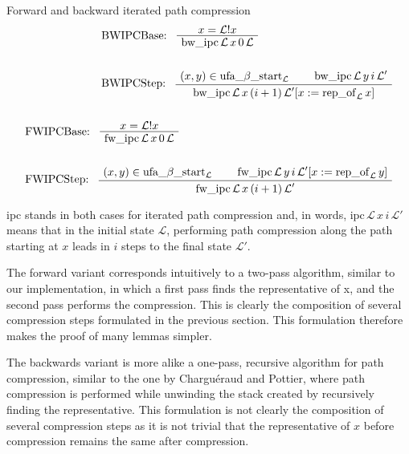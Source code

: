 \documentclass[headsepline,footsepline,footinclude=false,oneside,fontsize=11pt,paper=a4,listof=totoc,bibliography=totoc]{scrbook} %
\begin{document}
\begin{definition}{Forward and backward iterated path compression}
\begin{align}
\begin{split}
	&\text{ BWIPCBase: 
	\AxiomC{$x = \mathcal{L}!x$}
	\UnaryInfC{$\mathrm{bw\_ipc}\, \mathcal{L}\, x\, 0\, \mathcal{L}$}
	\DisplayProof
	} \\
	\\
	&\text{ BWIPCStep: 
		\AxiomC{$(x,y) \in \ufabstart$}
		\AxiomC{$\mathrm{bw\_ipc}\, \mathcal{L}\, y\, i\, \mathcal{L}'$}
		\BinaryInfC{$\mathrm{bw\_ipc}\, \mathcal{L}\, x\, (i + 1)\, \mathcal{L}'[x := \repof x]$}
		\DisplayProof
	}
\end{split}
\\
\begin{split}
	&\\
	&\text{ FWIPCBase: 
	\AxiomC{$x = \mathcal{L}!x$}
	\UnaryInfC{$\mathrm{fw\_ipc}\, \mathcal{L}\, x\, 0\, \mathcal{L}$}
	\DisplayProof
	} \\
	\\
	&\text{ FWIPCStep: 
	\AxiomC{$(x,y) \in \ufabstart$}
	\AxiomC{$\mathrm{fw\_ipc}\, \mathcal{L}\, y\, i\, \mathcal{L}'[x := \repof y]$}
	\BinaryInfC{$\mathrm{fw\_ipc}\, \mathcal{L}\, x\, (i + 1)\, \mathcal{L}'$}
	\DisplayProof
	}
\end{split}
\end{align}

ipc stands in both cases for iterated path compression and, in words, $\mathrm{ipc}\,  \mathcal{L}\, x\, i\, \mathcal{L}'$ means that in the initial state $\mathcal{L}$, performing path compression along the path starting at $x$ leads in $i$ steps to the final state $\mathcal{L}'$.
\end{definition}

The forward variant corresponds intuitively to a two-pass algorithm, similar to our implementation, in which a first pass finds the representative of x, and the second pass performs the compression. This is clearly the composition of several compression steps formulated in the previous section. This formulation therefore makes the proof of many lemmas simpler.

The backwards variant is more alike a one-pass, recursive algorithm for path compression, similar to the one by Charguéraud and Pottier, where path compression is performed while unwinding the stack created by recursively finding the representative. This formulation is not clearly the composition of several compression steps as it is not trivial that the representative of $x$ before compression remains the same after compression.
\end{document}

